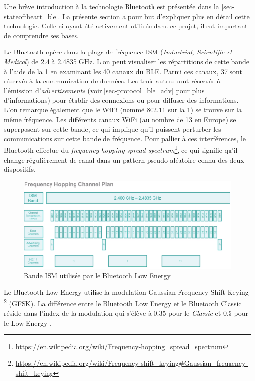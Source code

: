 
Une brève introduction à la technologie Bluetooth est présentée dans la \cref{sec-stateoftheart_ble}. La présente section a pour but d'expliquer plus en détail cette technologie. Celle-ci ayant été activement utilisée dans ce projet, il est important de comprendre ses bases.

Le Bluetooth opère dans la plage de fréquence ISM (\textit{Industrial, Scientific et Medical}) de 2.4 à 2.4835 GHz. L'on peut visualiser les répartitions de cette bande à l'aide de la \cref{fig-ble_channels_vs_802} en examinant les 40 canaux du BLE. Parmi ces canaux, 37 sont réservés à la communication de données. Les trois autres sont réservés à l'émission d'\textit{advertisements} (voir \cref{sec-protocol_ble_adv} pour plus d'informations) pour établir des connexions ou pour diffuser des informations. L'on remarque également que le WiFi (nommé 802.11 sur la \cref{fig-ble_channels_vs_802}) se trouve sur la même fréquence. Les différents canaux WiFi (au nombre de 13 en Europe) se superposent sur cette bande, ce qui implique qu'il puissent perturber les communications sur cette bande de fréquence. Pour pallier à ces interférences, le Bluetooth effectue du \textit{frequency-hopping spread spectrum}\footnote{\url{https://en.wikipedia.org/wiki/Frequency-hopping_spread_spectrum}}, ce qui signifie qu'il change régulièrement de canal dans un pattern pseudo aléatoire connu des deux dispositifs. \\

\begin{figure}[ht!]
    \centering
    \includegraphics[width=1.0\textwidth]{Figures/Protocols/Bluetooth/ble_channels_vs_802_11.PNG}
    \caption{Bande ISM utilisée par le Bluetooth Low Energy}
    \label{fig-ble_channels_vs_802}
\end{figure}

Le Bluetooth Low Energy utilise la modulation Gaussian Frequency Shift Keying \footnote{\url{https://en.wikipedia.org/wiki/Frequency-shift_keying\#Gaussian_frequency-shift_keying}} (GFSK).  La différence entre le Bluetooth Low Energy et le Bluetooth Classic réside dans l'index de la modulation qui s'élève à 0.35 pour le \textit{Classic} et 0.5 pour le Low Energy \cite{BluetootModulation:online}.

